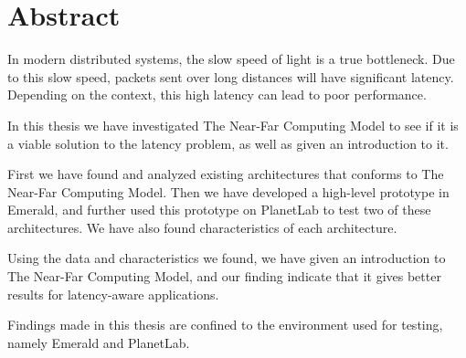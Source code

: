 \chapter*{Abstract}
In modern distributed systems, the slow speed of light is a true bottleneck. Due to this slow speed, packets sent over long distances will have significant latency. Depending on the context, this high latency can lead to poor performance.


In this thesis we have investigated The Near-Far Computing Model to see if it is a viable solution to the latency problem, as well as given an introduction to it. 

First we have found and analyzed existing architectures that conforms to The Near-Far Computing Model. Then we have developed a high-level prototype in Emerald, and further used this prototype on PlanetLab to test two of these architectures. We have also found characteristics of each architecture. 

Using the data and characteristics we found, we have given an introduction to The Near-Far Computing Model, and our finding indicate that it gives better results for latency-aware applications.

Findings made in this thesis are confined to the environment used for testing, namely Emerald and PlanetLab.
